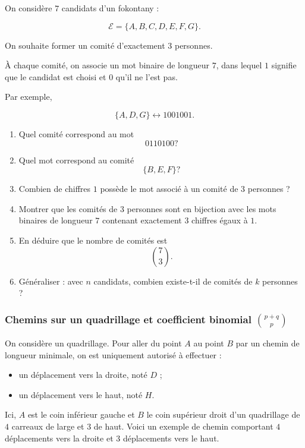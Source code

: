 On considère \(7\) candidats d'un fokontany :

\[
\mathcal{E}=\{A,B,C,D,E,F,G\}.
\]

On souhaite former un comité d'exactement \(3\) personnes.

À chaque comité, on associe un mot binaire de longueur \(7\), dans lequel
\(1\) signifie que le candidat est choisi et \(0\) qu'il ne l'est pas.

Par exemple,

\[
\{A,D,G\}
\longleftrightarrow
1001001.
\]

\begin{enumerate}
    \item Quel comité correspond au mot
    \[
    0110100?
    \]

    \item Quel mot correspond au comité
    \[
    \{B,E,F\}?
    \]

    \item Combien de chiffres \(1\) possède le mot associé à un comité de
    \(3\) personnes ?

    \item Montrer que les comités de \(3\) personnes sont en bijection avec
    les mots binaires de longueur \(7\) contenant exactement \(3\) chiffres
    égaux à \(1\).

    \item En déduire que le nombre de comités est
    \[
    \binom{7}{3}.
    \]

    \item Généraliser : avec \(n\) candidats, combien existe-t-il de comités
    de \(k\) personnes ?
\end{enumerate}

\subsubsection{Chemins sur un quadrillage et coefficient binomial
\(\binom{p+q}{p}\)}

On considère un quadrillage. Pour aller du point \(A\) au point \(B\) par un
chemin de longueur minimale, on est uniquement autorisé à effectuer :

\begin{itemize}
    \item un déplacement vers la droite, noté \(D\) ;
    \item un déplacement vers le haut, noté \(H\).
\end{itemize}

Ici, \(A\) est le coin inférieur gauche et \(B\) le coin supérieur droit d'un quadrillage de
\(4\) carreaux de large et \(3\) de haut. Voici un exemple de chemin comportant \(4\)
déplacements vers la droite et \(3\) déplacements vers le haut.

